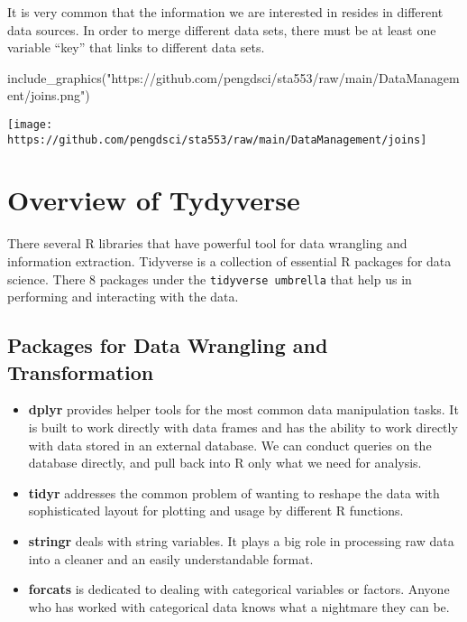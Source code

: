 \documentclass[
]{article}
\newenvironment{Shaded}{\begin{snugshade}}{\end{snugshade}}
\newcommand{\FunctionTok}[1]{\textcolor[rgb]{0.00,0.00,0.00}{#1}}
\newcommand{\NormalTok}[1]{#1}
\newcommand{\StringTok}[1]{\textcolor[rgb]{0.31,0.60,0.02}{#1}}
\begin{document}
It is very common that the information we are interested in resides in
different data sources. In order to merge different data sets, there
must be at least one variable ``key'' that links to different data sets.

\begin{Shaded}
\begin{Highlighting}[]
\FunctionTok{include\_graphics}\NormalTok{(}\StringTok{"https://github.com/pengdsci/sta553/raw/main/DataManagement/joins.png"}\NormalTok{)}
\end{Highlighting}
\end{Shaded}

\begin{center}\texttt{[image: https://github.com/pengdsci/sta553/raw/main/DataManagement/joins]} \end{center}

\hypertarget{overview-of-tydyverse}{%
\section{Overview of Tydyverse}\label{overview-of-tydyverse}}

There several R libraries that have powerful tool for data wrangling and
information extraction. Tidyverse is a collection of essential R
packages for data science. There 8 packages under the
\texttt{tidyverse\ umbrella} that help us in performing and interacting
with the data.

\hypertarget{packages-for-data-wrangling-and-transformation}{%
\subsection{Packages for Data Wrangling and
Transformation}\label{packages-for-data-wrangling-and-transformation}}

\begin{itemize}
\item
  \textbf{dplyr} provides helper tools for the most common data
  manipulation tasks. It is built to work directly with data frames and
  has the ability to work directly with data stored in an external
  database. We can conduct queries on the database directly, and pull
  back into R only what we need for analysis.
\item
  \textbf{tidyr} addresses the common problem of wanting to reshape the
  data with sophisticated layout for plotting and usage by different R
  functions.
\item
  \textbf{stringr} deals with string variables. It plays a big role in
  processing raw data into a cleaner and an easily understandable
  format.
\item
  \textbf{forcats} is dedicated to dealing with categorical variables or
  factors. Anyone who has worked with categorical data knows what a
  nightmare they can be.
\end{itemize}
\end{document}
